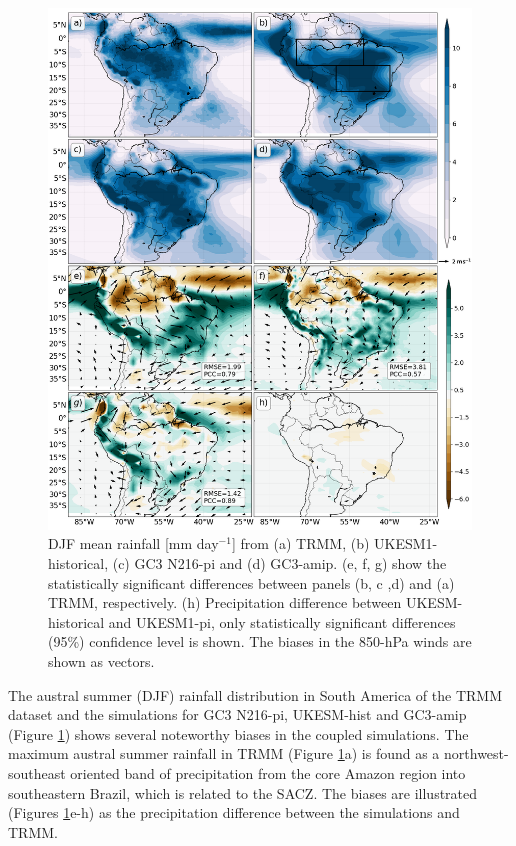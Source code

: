 \begin{figure}[t!]
\centering
 \includegraphics[width=0.875\linewidth]{figures/fig6.png}
\caption[Austral summer mean rainfall in the South American monsoon]{ DJF mean rainfall [mm day$^{-1}$] from (a) TRMM, (b) UKESM1-historical, (c) GC3 N216-pi and (d) GC3-amip. (e, f, g) show the statistically significant differences between panels (b, c ,d) and (a) TRMM, respectively. (h) Precipitation difference between UKESM-historical and  UKESM1-pi, only statistically significant differences (95\%) confidence level is shown.  The biases in the 850-hPa winds are shown as vectors. }
\label{fig:6}
\end{figure}

  The austral summer (DJF) rainfall distribution in South America of the TRMM dataset and the simulations for GC3 N216-pi, UKESM-hist and GC3-amip (Figure \ref{fig:6}) shows several noteworthy biases in the coupled simulations. 
The maximum austral summer rainfall in TRMM
(Figure \ref{fig:6}a) is found as a northwest-southeast oriented band of precipitation from the core Amazon region into southeastern Brazil, which is related to the SACZ.
The biases are illustrated (Figures \ref{fig:6}e-h) as the precipitation difference between the simulations and TRMM.
 
